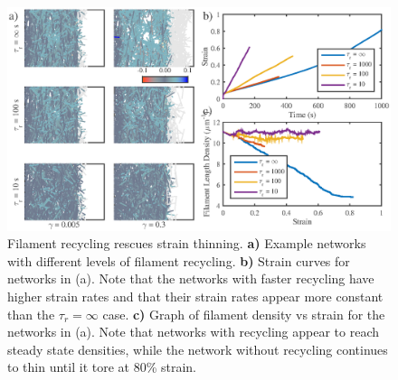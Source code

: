 \documentclass[10pt,letterpaper]{article}
\begin{document}

\begin{figure}[h!]
	\centering
	\includegraphics[width=\hsize]{figures/figure4_thinning}
	\caption{\label{fig:thinning}  Filament recycling rescues strain thinning.  \textbf{a)} Example networks with different levels of filament recycling.  \textbf{b)} Strain curves for networks in (a). Note that the networks with faster recycling have higher strain rates and that their strain rates appear more constant than the $\tau_r = \infty$ case. \textbf{c)} Graph of filament density vs strain for the networks in (a).  Note that networks with recycling appear to reach steady state densities, while the network without recycling continues to thin until it tore at 80\% strain. }
\end{figure}
\end{document}

